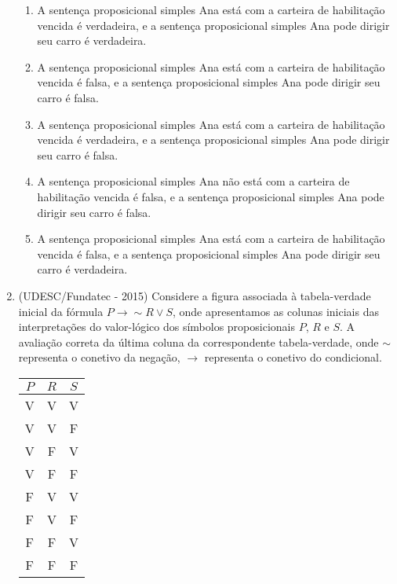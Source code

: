 \begin{enumerate}
  \begin{enumerate}
  \item A sentença proposicional simples Ana está com a carteira de habilitação vencida é verdadeira, e a sentença proposicional simples Ana pode dirigir seu carro é verdadeira.
  \item A sentença proposicional simples Ana está com a carteira de habilitação vencida é falsa, e a sentença proposicional simples Ana pode dirigir seu carro é falsa.
  \item A sentença proposicional simples Ana está com a carteira de habilitação vencida é verdadeira, e a sentença proposicional simples Ana pode dirigir seu carro é falsa.
  \item A sentença proposicional simples Ana não está com a carteira de habilitação vencida é falsa, e a sentença proposicional simples Ana pode dirigir seu carro é falsa.
  \item A sentença proposicional simples Ana está com a carteira de habilitação vencida é falsa, e a sentença proposicional simples Ana pode dirigir seu carro é verdadeira.
 \end{enumerate}
 
 
  \item (UDESC/Fundatec - 2015) Considere a figura associada à tabela-verdade inicial da fórmula $P \rightarrow \sim R \lor S$, onde apresentamos as colunas iniciais das interpretações do valor-lógico dos símbolos proposicionais $P$, $R$ e $S$. A avaliação correta da última coluna da correspondente tabela-verdade, onde $\sim$ representa o conetivo da negação, $\rightarrow$ representa o conetivo do condicional.
  
  \begin{table}[H]
 \centering
 \begin{tabular}{|c|c|c|} \hline
 $P$ & $R$ & $S$ \\ \hline
 V & V & V  \\ \hline
 V & V & F  \\ \hline
 V & F & V  \\ \hline
 V & F & F  \\ \hline
 F & V & V  \\ \hline
 F & V & F  \\ \hline
 F & F & V  \\ \hline
 F & F & F  \\ \hline
 \end{tabular}
 \end{table}
  

\end{enumerate}
